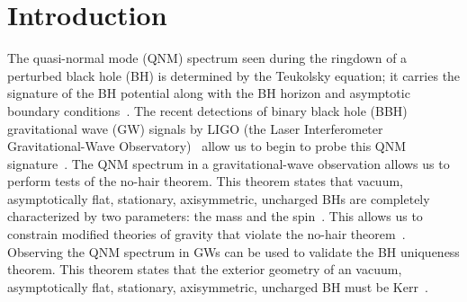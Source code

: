 \section{Introduction}

The quasi-normal mode (QNM) spectrum seen during the ringdown of a perturbed black hole (BH) is determined by the Teukolsky equation; it carries the signature of the BH potential along with the BH horizon and asymptotic boundary conditions~\cite{Teukolsky1, Teukolsky2, Teukolsky3}. The recent detections of binary black hole (BBH) gravitational wave (GW) signals by LIGO (the Laser Interferometer Gravitational-Wave Observatory)~\cite{Abbott:2016blz, Abbott:2016nmj, TheLIGOScientific:2016pea, Abbott:2017vtc, PhysRevLett.119.141101} allow us to begin to probe this QNM signature~\cite{TheLIGOScientific:2016src}. The QNM spectrum in a gravitational-wave observation allows us to perform tests of the no-hair theorem. This theorem states that vacuum, asymptotically flat, stationary, axisymmetric, uncharged BHs are completely characterized by two parameters: the mass and the spin~\cite{Mazur:2000pn,misner1973gravitation,Dreyer,Gossan,Kamaretsos}. This allows us to constrain modified theories of gravity that violate the no-hair theorem~\cite{Berti:2015itd, Yunes:2016jcc}. Observing the QNM spectrum in GWs can be used to validate the BH uniqueness theorem. This theorem states that the exterior geometry of an vacuum, asymptotically flat, stationary, axisymmetric, uncharged BH must be Kerr~\cite{Mazur:2000pn, Mars:1999yn}. 



